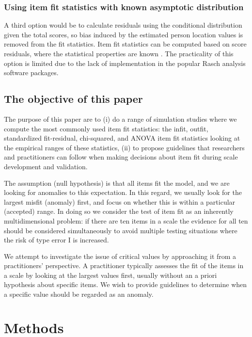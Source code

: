 \documentclass{article}
\begin{document}
\subsubsection{Using item fit statistics with known asymptotic distribution}

A third option would be to calculate residuals using the conditional distribution given the total scores, so bias induced by the estimated person location values is removed from the fit statistics. Item fit statistics can be computed based on score residuals, where the statistical properties are known \cite{Christensen-Kreiner2013}. The practicality of this option is limited due to the lack of implementation in the popular Rasch analysis software packages.


\subsection{The objective of this paper}

The purpose of this paper are to (i) do a range of simulation studies where we compute the most commonly used item fit statistics: the infit, outfit, standardized fit-residual, chi-squared, and ANOVA item fit statistics looking at the empirical ranges of these statistics, (ii) to propose guidelines that researchers and practitioners can follow when making decisions about item fit during scale development and validation.

The assumption (null hypothesis) is that all items fit the model, and we are looking for anomalies to this expectation. In this regard, we usually look for the largest misfit (anomaly) first, and focus on whether this is within a particular (accepted) range. In doing so we consider the test of item fit as an inherently multidimensional problem: if there are ten items in a scale the evidence for all ten should be considered simultaneously to avoid multiple testing situations where the risk of type error I is increased.

We attempt to investigate the issue of critical values by approaching it from a practitioners' perspective. A practitioner typically assesses the fit of the items in a scale by looking at the largest values first, usually without an a priori hypothesis about specific items. We wish to provide guidelines to determine when a specific value should be regarded as an anomaly.


\section{Methods}
\end{document}
